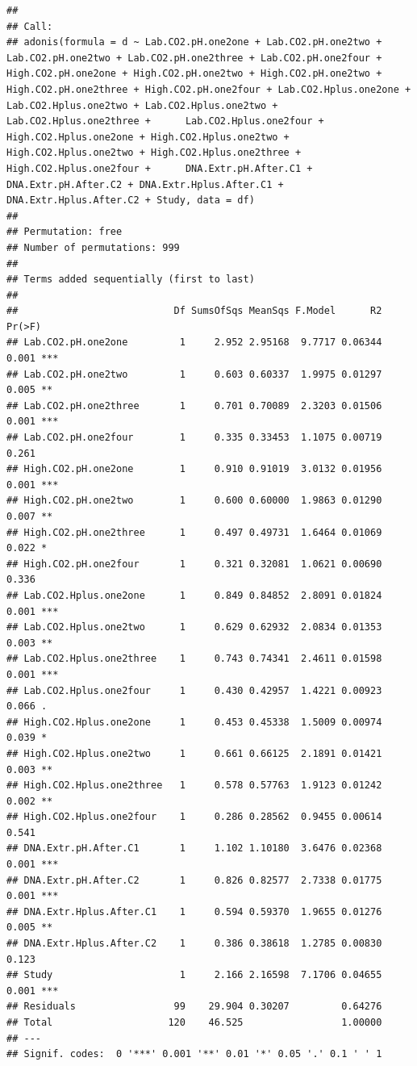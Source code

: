 \documentclass[]{article}
\begin{document}
\begin{verbatim}
## 
## Call:
## adonis(formula = d ~ Lab.CO2.pH.one2one + Lab.CO2.pH.one2two +      Lab.CO2.pH.one2two + Lab.CO2.pH.one2three + Lab.CO2.pH.one2four +      High.CO2.pH.one2one + High.CO2.pH.one2two + High.CO2.pH.one2two +      High.CO2.pH.one2three + High.CO2.pH.one2four + Lab.CO2.Hplus.one2one +      Lab.CO2.Hplus.one2two + Lab.CO2.Hplus.one2two + Lab.CO2.Hplus.one2three +      Lab.CO2.Hplus.one2four + High.CO2.Hplus.one2one + High.CO2.Hplus.one2two +      High.CO2.Hplus.one2two + High.CO2.Hplus.one2three + High.CO2.Hplus.one2four +      DNA.Extr.pH.After.C1 + DNA.Extr.pH.After.C2 + DNA.Extr.Hplus.After.C1 +      DNA.Extr.Hplus.After.C2 + Study, data = df) 
## 
## Permutation: free
## Number of permutations: 999
## 
## Terms added sequentially (first to last)
## 
##                           Df SumsOfSqs MeanSqs F.Model      R2 Pr(>F)    
## Lab.CO2.pH.one2one         1     2.952 2.95168  9.7717 0.06344  0.001 ***
## Lab.CO2.pH.one2two         1     0.603 0.60337  1.9975 0.01297  0.005 ** 
## Lab.CO2.pH.one2three       1     0.701 0.70089  2.3203 0.01506  0.001 ***
## Lab.CO2.pH.one2four        1     0.335 0.33453  1.1075 0.00719  0.261    
## High.CO2.pH.one2one        1     0.910 0.91019  3.0132 0.01956  0.001 ***
## High.CO2.pH.one2two        1     0.600 0.60000  1.9863 0.01290  0.007 ** 
## High.CO2.pH.one2three      1     0.497 0.49731  1.6464 0.01069  0.022 *  
## High.CO2.pH.one2four       1     0.321 0.32081  1.0621 0.00690  0.336    
## Lab.CO2.Hplus.one2one      1     0.849 0.84852  2.8091 0.01824  0.001 ***
## Lab.CO2.Hplus.one2two      1     0.629 0.62932  2.0834 0.01353  0.003 ** 
## Lab.CO2.Hplus.one2three    1     0.743 0.74341  2.4611 0.01598  0.001 ***
## Lab.CO2.Hplus.one2four     1     0.430 0.42957  1.4221 0.00923  0.066 .  
## High.CO2.Hplus.one2one     1     0.453 0.45338  1.5009 0.00974  0.039 *  
## High.CO2.Hplus.one2two     1     0.661 0.66125  2.1891 0.01421  0.003 ** 
## High.CO2.Hplus.one2three   1     0.578 0.57763  1.9123 0.01242  0.002 ** 
## High.CO2.Hplus.one2four    1     0.286 0.28562  0.9455 0.00614  0.541    
## DNA.Extr.pH.After.C1       1     1.102 1.10180  3.6476 0.02368  0.001 ***
## DNA.Extr.pH.After.C2       1     0.826 0.82577  2.7338 0.01775  0.001 ***
## DNA.Extr.Hplus.After.C1    1     0.594 0.59370  1.9655 0.01276  0.005 ** 
## DNA.Extr.Hplus.After.C2    1     0.386 0.38618  1.2785 0.00830  0.123    
## Study                      1     2.166 2.16598  7.1706 0.04655  0.001 ***
## Residuals                 99    29.904 0.30207         0.64276           
## Total                    120    46.525                 1.00000           
## ---
## Signif. codes:  0 '***' 0.001 '**' 0.01 '*' 0.05 '.' 0.1 ' ' 1
\end{verbatim}
\end{document}
